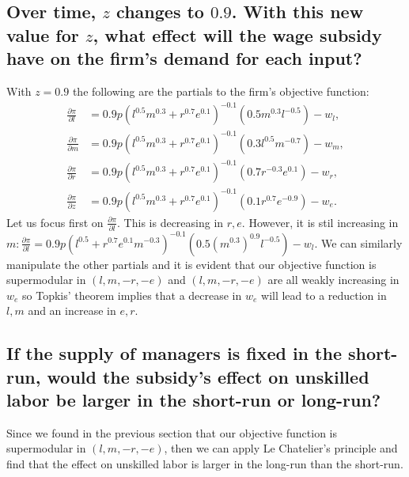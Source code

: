 \documentclass[11pt]{article} %
\begin{document}
\subsection{Over time, $z$ changes to $0.9$. With this new value for $z$, what effect will the wage subsidy have on the firm's demand for each input?}
With $z = 0.9$ the following are the partials to the firm's objective function:
\begin{align*}
\frac{\partial \pi}{\partial l} &= 0.9p(l^{0.5}m^{0.3} + r^{0.7}e^{0.1})^{-0.1}(0.5m^{0.3}l^{-0.5}) - w_l, \\
\frac{\partial \pi}{\partial m} &= 0.9p(l^{0.5}m^{0.3} + r^{0.7}e^{0.1})^{-0.1}(0.3l^{0.5}m^{-0.7}) - w_m, \\
\frac{\partial \pi}{\partial r} &= 0.9p(l^{0.5}m^{0.3} + r^{0.7}e^{0.1})^{-0.1}(0.7r^{-0.3}e^{0.1}) - w_r, \\
\frac{\partial \pi}{\partial z} &= 0.9p(l^{0.5}m^{0.3} + r^{0.7}e^{0.1})^{-0.1}(0.1r^{0.7}e^{-0.9}) - w_e. 
\end{align*}
Let us focus first on $\frac{\partial \pi}{\partial l}.$ This is decreasing in $r,e$. However, it is stil increasing in $m: \frac{\partial \pi}{\partial l} = 0.9p(l^{0.5} + r^{0.7}e^{0.1}m^{-0.3})^{-0.1}(0.5(m^{0.3})^{0.9}l^{-0.5}) - w_l$. We can similarly manipulate the other partials and it is evident that our objective function is supermodular in $(l,m,-r,-e)$ and $(l,m,-r,-e)$ are all weakly increasing in $w_e$ so Topkis' theorem implies that a decrease in $w_e$ will lead to a reduction in $l,m$ and an increase in $e,r$.
\subsection{If the supply of managers is fixed in the short-run, would the subsidy's effect on unskilled labor be larger in the short-run or long-run?}
Since we found in the previous section that our objective function is supermodular in $(l,m,-r,-e)$, then we can apply Le Chatelier's principle and find that the effect on unskilled labor is larger in the long-run than the short-run.
\end{document}
